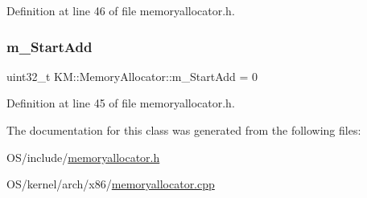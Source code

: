 Definition at line 46 of file memoryallocator.\+h.

\mbox{\label{class_k_m_1_1_memory_allocator_a7c20d888ecece0f856a4300f3134a5b8}} 
\subsubsection{\texorpdfstring{m\+\_\+\+Start\+Add}{m\_StartAdd}}
{\footnotesize\ttfamily uint32\+\_\+t K\+M\+::\+Memory\+Allocator\+::m\+\_\+\+Start\+Add = 0}



Definition at line 45 of file memoryallocator.\+h.



The documentation for this class was generated from the following files\+:\begin{DoxyCompactItemize}
\item 
O\+S/include/\hyperlink{memoryallocator_8h}{memoryallocator.\+h}\item 
O\+S/kernel/arch/x86/\hyperlink{memoryallocator_8cpp}{memoryallocator.\+cpp}\end{DoxyCompactItemize}
